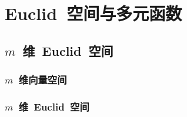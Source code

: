 

\chapter{Euclid~空间与多元函数}\label{ch:15}

\section{$m$~维~Euclid~空间}
\subsection{$m$~维向量空间}
\subsection{$m$~维~Euclid~空间}
